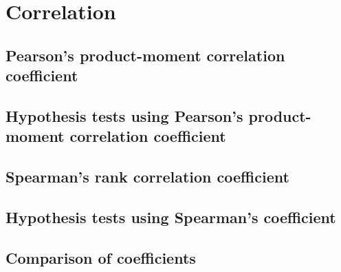 \chapter{Correlation}

\section{Pearson's product-moment correlation coefficient}
\section{Hypothesis tests using Pearson’s product-moment correlation coefficient}
\section{Spearman’s rank correlation coefficient}
\section{Hypothesis tests using Spearman’s coefficient}
\section{Comparison of coefficients}